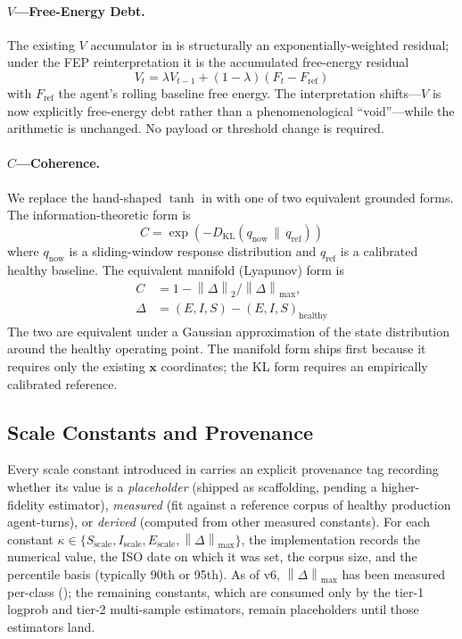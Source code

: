 \documentclass[11pt,twocolumn]{article}
\newcommand{\norm}[1]{\left\lVert #1 \right\rVert}
\newcommand{\eisv}{\ensuremath{\mathbf{x}}}
\begin{document}
\paragraph{$V$---Free-Energy Debt.}
The existing $V$ accumulator in  is structurally an
exponentially-weighted residual; under the FEP reinterpretation it is
the accumulated free-energy residual
\begin{equation}
  V_t = \lambda V_{t-1} + (1-\lambda)(F_t - F_{\text{ref}})
  \label{eq:V-grounded}
\end{equation}
with $F_{\text{ref}}$ the agent's rolling baseline free energy.
The interpretation shifts---$V$ is now explicitly free-energy debt
rather than a phenomenological ``void''---while the arithmetic is
unchanged. No payload or threshold change is required.

\paragraph{$C$---Coherence.}
We replace the hand-shaped $\tanh$ in  with one of
two equivalent grounded forms. The information-theoretic form is
\begin{equation}
  C = \exp\!\left(-D_{\mathrm{KL}}(q_{\text{now}} \,\|\, q_{\text{ref}})\right)
  \label{eq:C-KL}
\end{equation}
where $q_{\text{now}}$ is a sliding-window response distribution and
$q_{\text{ref}}$ is a calibrated healthy baseline. The equivalent
manifold (Lyapunov) form is
\begin{align}
  C &= 1 - \norm{\Delta}_2 / \norm{\Delta}_{\max}, \nonumber \\
  \Delta &= (E, I, S) - (E, I, S)_{\text{healthy}}
  \label{eq:C-manifold}
\end{align}
The two are equivalent under a Gaussian approximation of the state
distribution around the healthy operating point. The manifold form
ships first because it requires only the existing $\eisv$
coordinates; the KL form requires an empirically calibrated
reference.

\subsection{Scale Constants and Provenance}
\label{sec:scale-constants}

Every scale constant introduced in
carries an explicit provenance tag recording whether its value is
a \emph{placeholder} (shipped as scaffolding, pending a
higher-fidelity estimator), \emph{measured} (fit against a
reference corpus of healthy production agent-turns), or
\emph{derived} (computed from other measured constants). For
each constant $\kappa \in \{S_{\text{scale}}, I_{\text{scale}},
E_{\text{scale}}, \norm{\Delta}_{\max}\}$, the implementation
records the numerical value, the ISO date on which it was set,
the corpus size, and the percentile basis (typically 90th or
95th). As of v6, $\norm{\Delta}_{\max}$ has been measured
per-class (); the remaining
constants, which are consumed only by the tier-1 logprob and
tier-2 multi-sample estimators, remain placeholders until those
estimators land.
\end{document}
